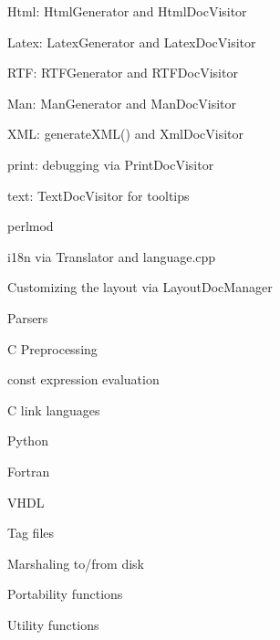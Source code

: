 {{{{\begin{DoxyItemize}
\begin{DoxyItemize}
\item Html\-: Html\-Generator and Html\-Doc\-Visitor
\item Latex\-: Latex\-Generator and Latex\-Doc\-Visitor
\item R\-T\-F\-: R\-T\-F\-Generator and R\-T\-F\-Doc\-Visitor
\item Man\-: Man\-Generator and Man\-Doc\-Visitor
\item X\-M\-L\-: generate\-X\-M\-L() and Xml\-Doc\-Visitor
\item print\-: debugging via Print\-Doc\-Visitor
\item text\-: Text\-Doc\-Visitor for tooltips
\item perlmod
\end{DoxyItemize}
\item i18n via Translator and language.\-cpp
\item Customizing the layout via Layout\-Doc\-Manager
\item Parsers
\begin{DoxyItemize}
\item C Preprocessing
\begin{DoxyItemize}
\item const expression evaluation
\end{DoxyItemize}
\item C link languages
\item Python
\item Fortran
\item V\-H\-D\-L
\item Tag files
\end{DoxyItemize}
\item Marshaling to/from disk
\item Portability functions
\item Utility functions 
\end{DoxyItemize}}}}}